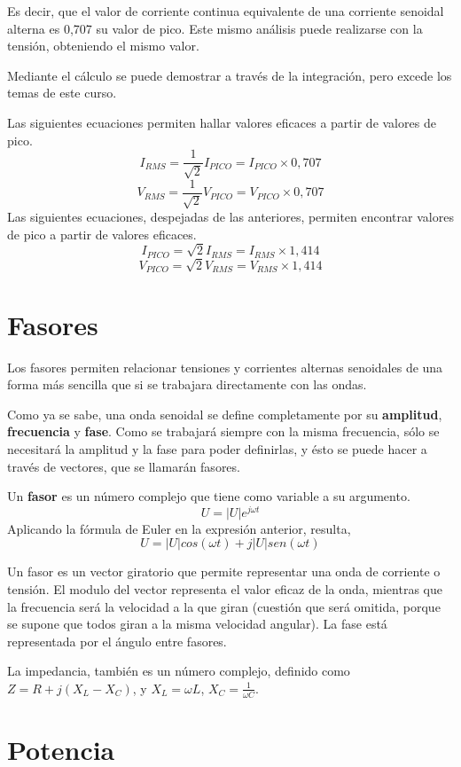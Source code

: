 Es decir, que el valor de corriente continua equivalente de una corriente senoidal alterna es 0,707 su valor de pico. Este mismo análisis puede realizarse con la tensión, obteniendo el mismo valor.

Mediante el cálculo se puede demostrar a través de la integración, pero excede los temas de este curso.

\begin{conclusiones}
	Las siguientes ecuaciones permiten hallar valores eficaces a partir de valores de pico.
	\begin{equation}
		I_{RMS} = \frac{1}{\sqrt{2}}I_{PICO}=I_{PICO}\times 0,707
	\end{equation}
	\begin{equation}
		V_{RMS} = \frac{1}{\sqrt{2}}V_{PICO}=V_{PICO}\times 0,707
	\end{equation}
	Las siguientes ecuaciones, despejadas de las anteriores, permiten encontrar valores de pico a partir de valores eficaces.
	\begin{equation}
		I_{PICO} = \sqrt{2}I_{RMS}=I_{RMS}\times 1,414
	\end{equation}
	\begin{equation}
		V_{PICO} = \sqrt{2}V_{RMS}=V_{RMS}\times 1,414
	\end{equation}
\end{conclusiones}
\section{Fasores}
Los fasores permiten relacionar tensiones y corrientes alternas senoidales de una forma más sencilla que si se trabajara directamente con las ondas.

Como ya se sabe, una onda senoidal se define completamente por su \textbf{amplitud}, \textbf{frecuencia} y \textbf{fase}. Como se trabajará siempre con la misma frecuencia, sólo se necesitará la amplitud y la fase para poder definirlas, y ésto se puede hacer a través de vectores, que se llamarán fasores.

Un \textbf{fasor} es un número complejo que tiene como variable a su argumento.
$$ U = | U | e^{j\omega t} $$
Aplicando la fórmula de Euler en la expresión anterior, resulta,
$$ U = | U | cos (\omega t) + j|U| sen(\omega t) $$

Un fasor es un vector giratorio que permite representar una onda de corriente o tensión. El modulo del vector representa el valor eficaz de la onda, mientras que la frecuencia será la velocidad a la que giran (cuestión que será omitida, porque se supone que todos giran a la misma velocidad angular). La fase está representada por el ángulo entre fasores.

La impedancia, también es un número complejo, definido como $Z= R+j(X_L - X_C)$, y $X_L = \omega L $, $X_C = \frac{1}{\omega C}$.
\section{Potencia}
